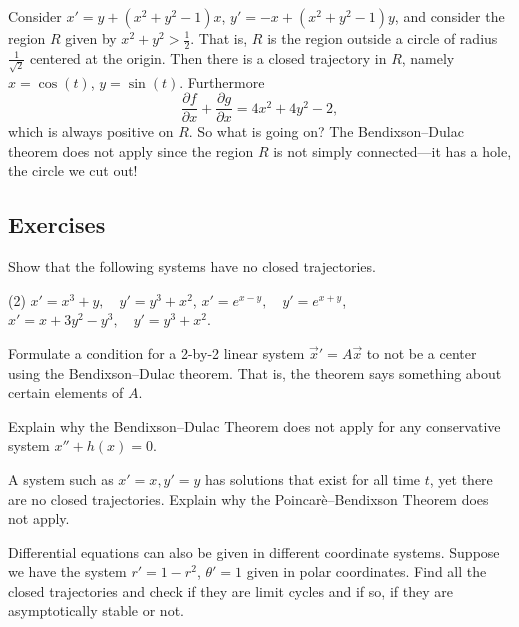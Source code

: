 \begin{example}
Consider
$x' = y+(x^2+y^2-1)x$, 
$y' = -x +(x^2+y^2-1)y$, and consider the region $R$ given by $x^2+y^2 >
\frac{1}{2}$.  That is, $R$ is the region outside a circle of radius
$\frac{1}{\sqrt{2}}$ centered at the origin.  Then
there is a closed trajectory in $R$, namely $x=\cos(t)$, $y=\sin(t)$.
Furthermore 
\begin{equation*}
\frac{\partial f}{\partial x} + 
\frac{\partial g}{\partial x} = 4x^2+4y^2-2 ,
\end{equation*}
which is always positive on $R$.  So what is going on?  The Bendixson--Dulac theorem does not
apply since the region $R$ is not simply connected---it has a hole, the
circle we cut out!
\end{example}

\subsection{Exercises}

\begin{exercise}
Show that the following systems have no closed trajectories.
\begin{tasks}(2)
\task $x'=x^3+y,\quad y'=y^3+x^2$,
\task $x'=e^{x-y},\quad y'=e^{x+y}$,
\task $x'=x+3y^2-y^3,\quad y'=y^3+x^2$.
\end{tasks}
\end{exercise}

\begin{exercise}
Formulate a condition for a 2-by-2 linear system
${\vec{x}}' = A \vec{x}$ to not be a center using the Bendixson--Dulac theorem.
That is, the theorem says something about certain elements of $A$.
\end{exercise}

\begin{exercise}
Explain why the Bendixson--Dulac Theorem does not apply for any conservative
system $x''+h(x) = 0$.
\end{exercise}

\begin{exercise}
A system such as $x'=x, y'=y$ has solutions that exist for all time $t$,
yet there are no closed trajectories.  Explain
why the Poincar\`e--Bendixson Theorem does not apply.
\end{exercise}

\begin{exercise}
Differential equations can also be given in different coordinate systems.  
Suppose we have the system $r' = 1-r^2$, $\theta' = 1$ given
in polar coordinates.  Find all the closed trajectories and check if they
are limit cycles and if so, if they are asymptotically stable or not.
\end{exercise}


